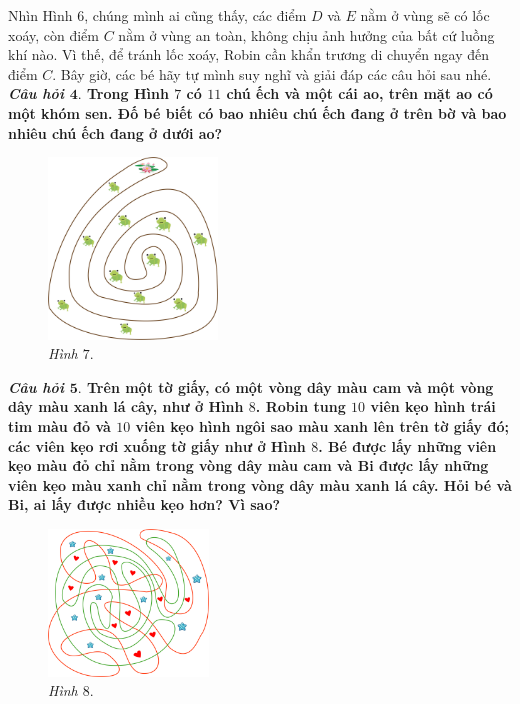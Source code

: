 	Nhìn Hình $6$, chúng mình ai cũng thấy, các điểm $D$ và $E$ nằm ở vùng sẽ có lốc xoáy, còn điểm $C$ nằm ở vùng an toàn, không chịu ảnh hưởng của bất cứ luồng khí nào. Vì thế, để tránh lốc xoáy, Robin cần khẩn trương di chuyển ngay đến điểm $C$.
	\vskip 0.05cm
	Bây giờ, các bé hãy tự mình suy nghĩ và giải đáp các câu hỏi sau nhé.
	\vskip 0.1cm
	\textbf{\textit{Câu hỏi $\pmb{4.}$} {\color{abc}Trong Hình $7$ có $11$ chú ếch và một cái ao, trên mặt ao có một khóm sen. Đố bé biết có bao nhiêu chú ếch đang ở trên bờ và bao nhiêu chú ếch đang ở dưới ao?}}
	\begin{figure}[H]
		\centering
		\vspace*{-5pt}
		\captionsetup{labelformat= empty, justification=centering}
		\includegraphics[width=0.4\textwidth]{pic11}
		\caption{\small\textit{Hình $7.$}}
		\vspace*{-10pt}
	\end{figure}
	\textbf{\textit{Câu hỏi $\pmb{5.}$} {\color{abc}Trên một tờ giấy, có một vòng dây màu cam và một vòng dây màu xanh lá cây, như ở Hình $8$. Robin tung $10$ viên kẹo hình trái tim màu đỏ và $10$ viên kẹo hình ngôi sao màu xanh lên trên tờ giấy đó; các viên kẹo rơi xuống tờ giấy như ở Hình $8$. Bé được lấy những viên kẹo màu đỏ chỉ nằm trong vòng dây màu cam và Bi được lấy những viên kẹo màu xanh chỉ nằm trong vòng dây màu  xanh lá cây. Hỏi bé và Bi, ai lấy được nhiều kẹo hơn? Vì sao?}}
	\begin{figure}[H]
		\centering
		\vspace*{-5pt}
		\captionsetup{labelformat= empty, justification=centering}
		\includegraphics[width=0.38\textwidth]{8}
		\caption{\small\textit{Hình $8.$}}
		\vspace*{-10pt}
	\end{figure}
